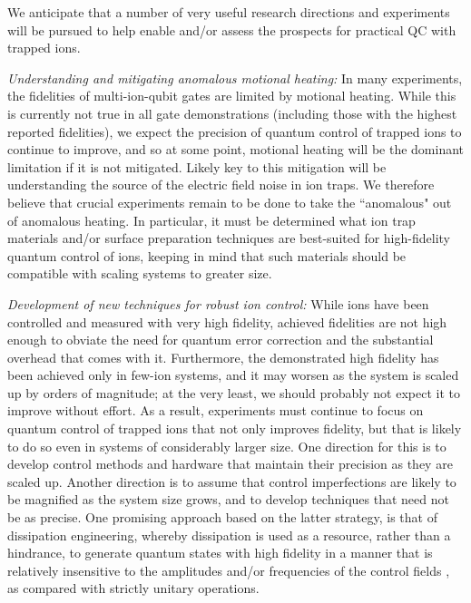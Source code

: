 \documentclass[%
12pt,
 amsmath,amssymb,
]{revtex4-2}
\begin{document}
We anticipate that a number of very useful research directions and experiments will be pursued to help enable and/or assess the prospects for practical QC with trapped ions.

\textit{Understanding and mitigating anomalous motional heating:} In many experiments, the fidelities of multi-ion-qubit gates are limited by motional heating.  While this is currently not true in all gate demonstrations (including those with the highest reported fidelities), we expect the precision of quantum control of trapped ions to continue to improve, and so at some point, motional heating will be the dominant limitation if it is not mitigated.  Likely key to this mitigation will be understanding the source of the electric field noise in ion traps.  We therefore believe that crucial experiments remain to be done to take the ``anomalous" out of anomalous heating.  In particular, it must be determined what ion trap materials and/or surface preparation techniques are best-suited for high-fidelity quantum control of ions, keeping in mind that such materials should be compatible with scaling systems to greater size.

\textit{Development of new techniques for robust ion control:} While ions have been controlled and measured with very high fidelity, achieved fidelities are not high enough to obviate the need for quantum error correction and the substantial overhead that comes with it.  Furthermore, the demonstrated high fidelity has been achieved only in few-ion systems, and it may worsen as the system is scaled up by orders of magnitude; at the very least, we should probably not expect it to improve without effort.  As a result, experiments must continue to focus on quantum control of trapped ions that not only improves fidelity, but that is likely to do so even in systems of considerably larger size.  One direction for this is to develop control methods and hardware that maintain their precision as they are scaled up.  Another direction is to assume that control imperfections are likely to be magnified as the system size grows, and to develop techniques that need not be as precise.  One promising approach based on the latter strategy, is that of dissipation engineering, whereby dissipation is used as a resource, rather than a hindrance, to generate quantum states with high fidelity in a manner that is relatively insensitive to the amplitudes and/or frequencies of the control fields \cite{PoyatosDE1996, LinDE2013}, as compared with strictly unitary operations.
\end{document}
